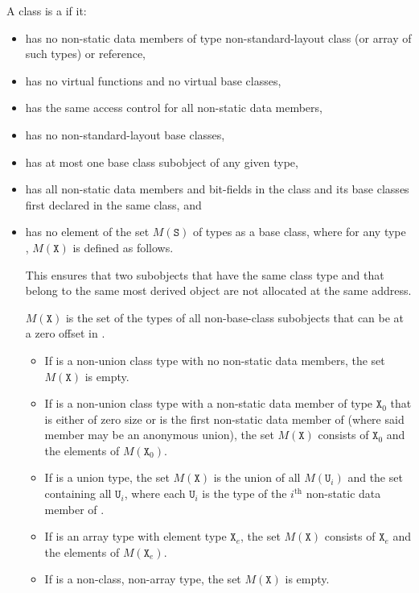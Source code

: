 \pnum
A class  is a  if it:
\begin{itemize}
\item has no non-static data members of type non-standard-layout class
(or array of such types) or reference,

\item has no virtual functions and no
virtual base classes,

\item has the same access control
for all non-static data members,

\item has no non-standard-layout base classes,
\item has at most one base class subobject of any given type,
\item has all non-static data members and bit-fields in the class and
its base classes first declared in the same class, and

\item has no element of the set $M(\mathtt{S})$ of types
as a base class,
where for any type , $M(\mathtt{X})$ is defined as follows.
\begin{footnote}

This ensures that two subobjects that have the same class type and that
belong to the same most derived object are not allocated at the same
address.
\end{footnote}
\begin{note}
$M(\mathtt{X})$ is the set of the types of all non-base-class subobjects
that can be at a zero offset in .
\end{note}

\begin{itemize}
\item If  is a non-union class type with no non-static data members,
the set $M(\mathtt{X})$ is empty.

\item If  is a non-union class type with a non-static data
member of type $\mathtt{X}_0$
that is either of zero size or
is the first non-static data member of 
(where said member may be an anonymous union),
the set $M(\mathtt{X})$ consists of $\mathtt{X}_0$ and the elements of
$M(\mathtt{X}_0)$.

\item If  is a union type, the set $M(\mathtt{X})$ is
the union of all $M(\mathtt{U}_i)$ and the set containing all $\mathtt{U}_i$,
where each $\mathtt{U}_i$ is the type of the $i^\text{th}$ non-static data member
of .

\item If  is an array type with element type $\mathtt{X}_e$,
the set $M(\mathtt{X})$ consists of $\mathtt{X}_e$
and the elements of $M(\mathtt{X}_e)$.

\item If  is a non-class, non-array type, the set $M(\mathtt{X})$ is empty.
\end{itemize}
\end{itemize}

